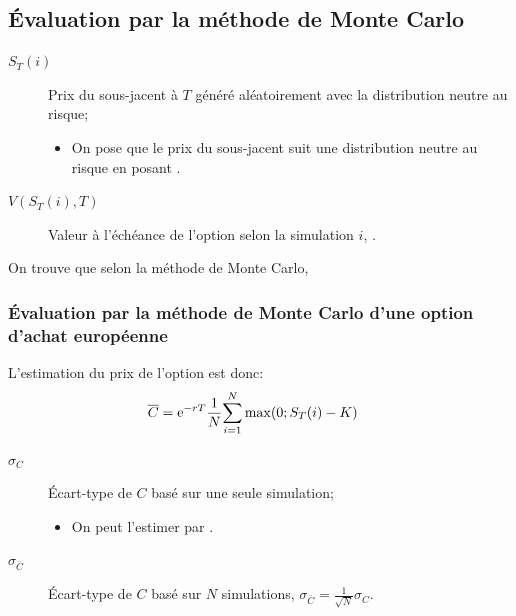 \documentclass[10pt, french]{article}
\begin{document}
\begin{multicols*}{2}
\subsection{Évaluation par la méthode de Monte Carlo}
\begin{distributions}[Notation]
\begin{description}
	\item[$S_{T}(i)$]	Prix du sous-jacent à $T$ généré aléatoirement avec la distribution neutre au risque;
		\begin{itemize}
		\item	On pose que le prix du sous-jacent suit une distribution neutre au risque en posant 
 .
		\end{itemize}
	\item[$V(S_{T}(i), T)$]	Valeur à l'échéance de l'option selon la simulation $i$, .
\end{description}
\end{distributions}

On trouve que selon la méthode de Monte Carlo, 

\subsubsection*{Évaluation par la méthode de Monte Carlo d'une option d'achat européenne}
L'estimation du prix de l'option est donc:
\begin{align*}
	\overline{C}
	&=	\textrm{e}^{-rT} \frac{1}{N} \overset{N}{\underset{i	=	1}{\sum}} \max(0; S_{T}(i)	-	K)
\end{align*}

\begin{distributions}[Notation]
\begin{description}
	\item[$\sigma_{C}$]	Écart-type de $C$ basé sur une seule simulation;
		\begin{itemize}
		\item	On peut l'estimer par .
		\end{itemize}
	\item[$\sigma_{\overline{C}}$]	Écart-type de $C$ basé sur $N$ simulations, $\sigma_{\overline{C}}	=	\frac{1}{\sqrt{N}}\sigma_{C}$.
\end{description}
\end{distributions}


\end{multicols*}
\end{document}
